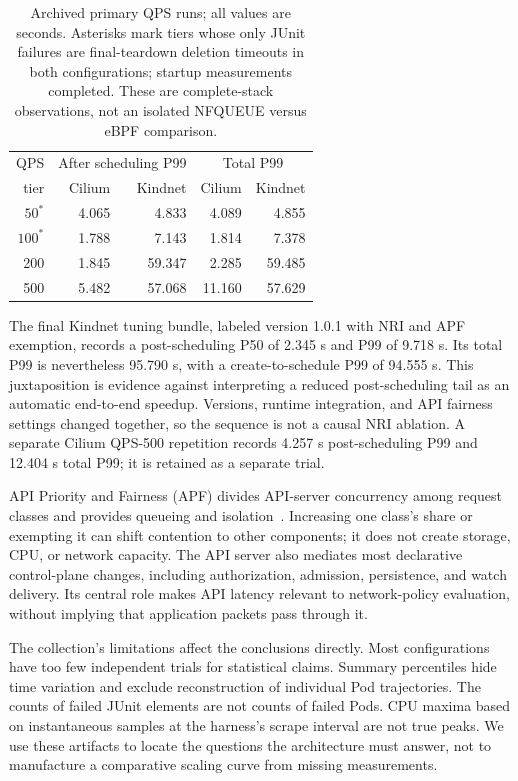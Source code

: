 \documentclass[letterpaper,twocolumn,10pt]{article}
\begin{document}
\begin{table}[t]
\centering
\small
\begin{tabular}{rrrrr}
\toprule
QPS & \multicolumn{2}{c}{After scheduling P99} & \multicolumn{2}{c}{Total P99}\\
tier & Cilium & Kindnet & Cilium & Kindnet\\
\midrule
$50^{*}$ & 4.065 & 4.833 & 4.089 & 4.855\\
$100^{*}$ & 1.788 & 7.143 & 1.814 & 7.378\\
200 & 1.845 & 59.347 & 2.285 & 59.485\\
500 & 5.482 & 57.068 & 11.160 & 57.629\\
\bottomrule
\end{tabular}
\caption{Archived primary QPS runs; all values are seconds. Asterisks mark
tiers whose only JUnit failures are final-teardown deletion timeouts in
both configurations; startup measurements completed. These are
complete-stack observations, not an isolated NFQUEUE versus eBPF
comparison.}
\label{tab:qps}
\end{table}

The final Kindnet tuning bundle, labeled version 1.0.1 with NRI and
APF exemption, records a post-scheduling P50 of 2.345 s and P99 of
9.718 s. Its total P99 is nevertheless 95.790 s, with a
create-to-schedule P99 of 94.555 s. This juxtaposition is evidence
against interpreting a reduced post-scheduling tail as an automatic
end-to-end speedup. Versions, runtime integration, and API fairness
settings changed together, so the sequence is not a causal NRI ablation.
A separate Cilium QPS-500 repetition records 4.257 s post-scheduling
P99 and 12.404 s total P99; it is retained as a separate trial.

API Priority and Fairness (APF) divides API-server concurrency among
request classes and provides queueing and isolation~\cite{k8sapf}.
Increasing one class's share or exempting it can shift contention to
other components; it does not create storage, CPU, or network capacity.
The API server also mediates most declarative control-plane changes,
including authorization, admission, persistence, and watch delivery.
Its central role makes API latency relevant to network-policy evaluation,
without implying that application packets pass through it.

The collection's limitations affect the conclusions directly. Most
configurations have too few independent trials for statistical claims.
Summary percentiles hide time variation and exclude reconstruction of
individual Pod trajectories. The counts of failed JUnit elements are
not counts of failed Pods. CPU maxima based on instantaneous samples
at the harness's scrape interval are not true peaks. We use these
artifacts to locate the questions the architecture must answer, not
to manufacture a comparative scaling curve from missing measurements.
\end{document}
